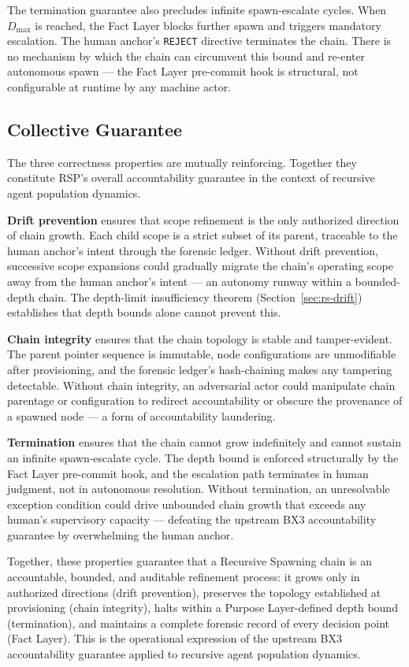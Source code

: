 \medskip
The termination guarantee also precludes infinite spawn-escalate cycles. When $D_{\mathrm{max}}$ is reached, the Fact Layer blocks further spawn and triggers mandatory escalation. The human anchor's \texttt{REJECT} directive terminates the chain. There is no mechanism by which the chain can circumvent this bound and re-enter autonomous spawn — the Fact Layer pre-commit hook is structural, not configurable at runtime by any machine actor.

\subsection{Collective Guarantee}
\label{sec:rs-collective-guarantee}

The three correctness properties are mutually reinforcing. Together they constitute RSP's overall accountability guarantee in the context of recursive agent population dynamics.

\medskip
\textbf{Drift prevention} ensures that scope refinement is the only authorized direction of chain growth. Each child scope is a strict subset of its parent, traceable to the human anchor's intent through the forensic ledger. Without drift prevention, successive scope expansions could gradually migrate the chain's operating scope away from the human anchor's intent — an autonomy runway within a bounded-depth chain. The depth-limit insufficiency theorem (Section~\ref{sec:rs-drift}) establishes that depth bounds alone cannot prevent this.

\medskip
\textbf{Chain integrity} ensures that the chain topology is stable and tamper-evident. The parent pointer sequence is immutable, node configurations are unmodifiable after provisioning, and the forensic ledger's hash-chaining makes any tampering detectable. Without chain integrity, an adversarial actor could manipulate chain parentage or configuration to redirect accountability or obscure the provenance of a spawned node — a form of accountability laundering.

\medskip
\textbf{Termination} ensures that the chain cannot grow indefinitely and cannot sustain an infinite spawn-escalate cycle. The depth bound is enforced structurally by the Fact Layer pre-commit hook, and the escalation path terminates in human judgment, not in autonomous resolution. Without termination, an unresolvable exception condition could drive unbounded chain growth that exceeds any human's supervisory capacity — defeating the upstream BX3 accountability guarantee by overwhelming the human anchor.

\medskip
Together, these properties guarantee that a Recursive Spawning chain is an accountable, bounded, and auditable refinement process: it grows only in authorized directions (drift prevention), preserves the topology established at provisioning (chain integrity), halts within a Purpose Layer-defined depth bound (termination), and maintains a complete forensic record of every decision point (Fact Layer). This is the operational expression of the upstream BX3 accountability guarantee applied to recursive agent population dynamics.